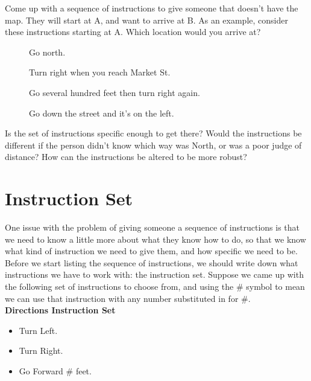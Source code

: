 \begin{center} \end{center}

Come up with a sequence of instructions to give someone that doesn't have the map. They will start at A, and want to arrive at B. As an example, consider these instructions starting at A. Which location would you arrive at?

\begin{description}
	\item[] Go north.
	\item[] Turn right when you reach Market St.
	\item[] Go several hundred feet then turn right again.
	\item[] Go down the street and it's on the left.
\end{description}

Is the set of instructions specific enough to get there? Would the instructions be different if the person didn't know which way was North, or was a poor judge of distance? How can the instructions be altered to be more robust?\\

\section{Instruction Set}


One issue with the problem of giving someone a sequence of instructions is that we need to know a little more about what they know how to do, so that we know what kind of instruction we need to give them, and how specific we need to be.\\

Before we start listing the sequence of instructions, we should write down what instructions we have to work with: the instruction set. Suppose we came up with the following set of instructions to choose from, and using the \# symbol to mean we can use that instruction with any number substituted in for \#.\\

\textbf{Directions Instruction Set}
\begin{itemize}
	\item Turn Left.
	\item Turn Right.
	\item Go Forward \# feet.
\end{itemize}
	
